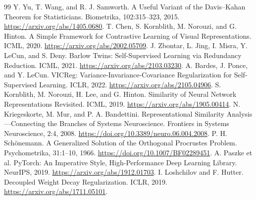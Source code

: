 \documentclass[11pt,a4paper]{article}
\begin{document}
\begin{thebibliography}{99}
 Y. Yu, T. Wang, and R. J. Samworth. A Useful Variant of the Davis--Kahan Theorem for Statisticians. Biometrika, 102:315--323, 2015. \url{https://arxiv.org/abs/1405.0680}.
 T. Chen, S. Kornblith, M. Norouzi, and G. Hinton. A Simple Framework for Contrastive Learning of Visual Representations. ICML, 2020. \url{https://arxiv.org/abs/2002.05709}.
 J. Zbontar, L. Jing, I. Misra, Y. LeCun, and S. Deny. Barlow Twins: Self-Supervised Learning via Redundancy Reduction. ICML, 2021. \url{https://arxiv.org/abs/2103.03230}.
 A. Bardes, J. Ponce, and Y. LeCun. VICReg: Variance-Invariance-Covariance Regularization for Self-Supervised Learning. ICLR, 2022. \url{https://arxiv.org/abs/2105.04906}.
 S. Kornblith, M. Norouzi, H. Lee, and G. Hinton. Similarity of Neural Network Representations Revisited. ICML, 2019. \url{https://arxiv.org/abs/1905.00414}.
 N. Kriegeskorte, M. Mur, and P. A. Bandettini. Representational Similarity Analysis---Connecting the Branches of Systems Neuroscience. Frontiers in Systems Neuroscience, 2:4, 2008. \url{https://doi.org/10.3389/neuro.06.004.2008}.
 P. H. Sch\"onemann. A Generalized Solution of the Orthogonal Procrustes Problem. Psychometrika, 31:1--10, 1966. \url{https://doi.org/10.1007/BF02289451}.
 A. Paszke et al. PyTorch: An Imperative Style, High-Performance Deep Learning Library. NeurIPS, 2019. \url{https://arxiv.org/abs/1912.01703}.
 I. Loshchilov and F. Hutter. Decoupled Weight Decay Regularization. ICLR, 2019. \url{https://arxiv.org/abs/1711.05101}.
\end{thebibliography}
\end{document}
